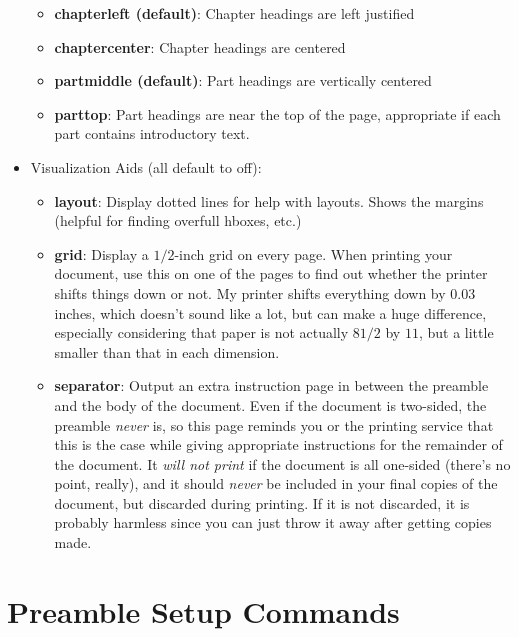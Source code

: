 \documentclass[phd,hardcopy,twosidetoc,letterpaper,chaptercenter,parttop,lol,lof,lot]{byumsphd}
\begin{document}
\begin{itemize}
\begin{itemize}
            \item \textbf{chapterleft (default)}: Chapter headings are left justified
            \item \textbf{chaptercenter}: Chapter headings are centered
            \item \textbf{partmiddle (default)}: Part headings are vertically centered
            \item \textbf{parttop}: Part headings are near the top of the page, appropriate if each part contains introductory text.
        \end{itemize}
\pagebreak
    \item Visualization Aids (all default to off):
        \begin{itemize}
            \item \textbf{layout}: Display dotted lines for help with layouts.  Shows the margins (helpful for finding overfull hboxes, etc.)
            \item \textbf{grid}: Display a \( 1/2 \)-inch grid on every page.  When printing your document, use this on one of the pages to find out whether the printer shifts things down or not.  My printer shifts everything down by \( 0.03 \) inches, which doesn't sound like a lot, but can make a huge difference, especially considering that paper is not actually \( 8 1/2 \) by \( 11 \), but a little smaller than that in each dimension.
            \item \textbf{separator}: Output an extra instruction page in between the preamble and the body of the document.  Even if the document is two-sided, the preamble \emph{never} is, so this page reminds you or the printing service that this is the case while giving appropriate instructions for the remainder of the document.  It \emph{will not print} if the document is all one-sided (there's no point, really), and it should \emph{never} be included in your final copies of the document, but discarded during printing.  If it is not discarded, it is probably harmless since you can just throw it away after getting copies made.
        \end{itemize}
\end{itemize}

\section{Preamble Setup Commands}
\end{document}
